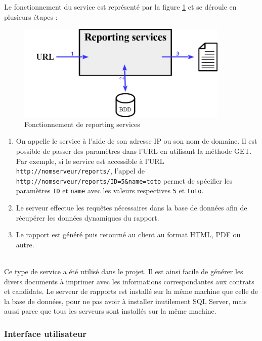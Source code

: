 Le fonctionnement du service est représenté par la figure \ref{reporting_services} et se déroule en plusieurs étapes :
\begin{figure}[!h]
	\center
	\includegraphics[width=0.9\textwidth]{img/reporting_services.png}
	\caption{Fonctionnement de reporting services}
	\label{reporting_services}
\end{figure}
\begin{enumerate}
	\item On appelle le service à l'aide de son adresse IP ou son nom de domaine.
Il est possible de passer des paramètres dans l'URL en utilisant la méthode GET.
Par exemple, si le service est accessible à l'URL \lstinline{http://nomserveur/reports/}, l'appel de \lstinline{http://nomserveur/reports/ID=5&name=toto} permet de spécifier les paramètres \lstinline{ID} et \lstinline{name} avec les valeurs respectives \lstinline{5} et \lstinline{toto}.
	\item Le serveur effectue les requêtes nécessaires dans la base de données afin de récupérer les données dynamiques du rapport.
	\item Le rapport est généré puis retourné au client au format HTML, PDF ou autre.
\end{enumerate}
~~\\

Ce type de service a été utilisé dans le projet.
Il est ainsi facile de générer les divers documents à imprimer avec les informations correspondantes aux contrats et candidats.
Le serveur de rapports est installé sur la même machine que celle de la base de données, pour ne pas avoir à installer inutilement SQL Server, mais aussi parce que tous les serveurs sont installés sur la même machine.


\subsubsection{Interface utilisateur}

